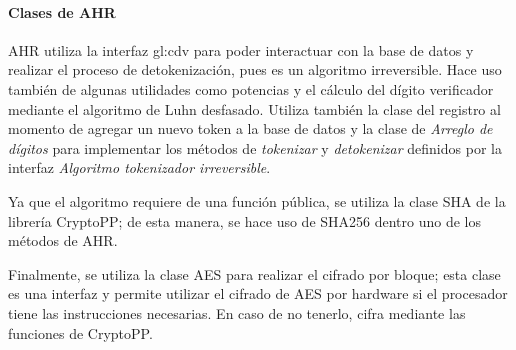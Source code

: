 %
%
%

\paragraph{Clases de AHR}

AHR utiliza la interfaz \acrshort{gl:cdv} para poder interactuar con la base de
datos y realizar el proceso de detokenización, pues es un algoritmo
irreversible. Hace uso también de algunas utilidades como potencias y
el cálculo del dígito verificador mediante el algoritmo de Luhn desfasado.
Utiliza también la clase del registro al momento de agregar un nuevo token
a la base de datos y la clase de \textit{Arreglo de dígitos} para implementar
los métodos de \textit{tokenizar} y \textit{detokenizar} definidos por la
interfaz \textit{Algoritmo tokenizador irreversible}.

Ya que el algoritmo requiere de una función pública, se utiliza la clase SHA de
la librería CryptoPP; de esta manera, se hace uso de SHA256 dentro uno de
los métodos de AHR.

Finalmente, se utiliza la clase AES para realizar el cifrado por bloque; esta
clase es una interfaz y permite utilizar el cifrado de AES por hardware si
el procesador tiene las instrucciones necesarias. En caso de no tenerlo,
cifra mediante las funciones de CryptoPP.

